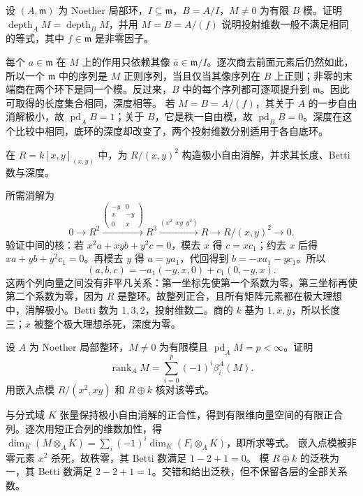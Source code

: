 \begin{exercise}\label{g5:ex:quotient-ring-depth}
	设 \((A,\mathfrak m)\) 为 Noether 局部环，\(I\subseteq\mathfrak m\)，\(B=A/I\)，\(M\ne0\) 为有限 \(B\) 模。证明 \(\operatorname{depth}_A M=\operatorname{depth}_B M\)，并用 \(M=B=A/(f)\) 说明投射维数一般不满足相同的等式，其中 \(f\in\mathfrak m\) 是非零因子。
\end{exercise}
\begin{solution}
	每个 \(a\in\mathfrak m\) 在 \(M\) 上的作用只依赖其像 \(\overline a\in\mathfrak m/I\)。逐次商去前面元素后仍然如此，所以一个 \(\mathfrak m\) 中的序列是 \(M\) 正则序列，当且仅当其像序列在 \(B\) 上正则；非零的末端商在两个环下是同一个模。反过来，\(B\) 中的每个序列都可逐项提升到 \(\mathfrak m\)。因此可取得的长度集合相同，深度相等。
	若 \(M=B=A/(f)\)，其关于 \(A\) 的一步自由消解极小，故 \(\operatorname{pd}_A B=1\)；关于 \(B\)，它是秩一自由模，故 \(\operatorname{pd}_B B=0\)。深度在这个比较中相同，底环的深度却改变了，两个投射维数分别适用于各自底环。
\end{solution}

\begin{exercise}\label{g5:ex:squared-maximal-ideal-resolution}
	在 \(R=k[x,y]_{(x,y)}\) 中，为 \(R/(x,y)^2\) 构造极小自由消解，并求其长度、Betti 数与深度。
\end{exercise}
\begin{solution}
	所需消解为
	\[
		0\longrightarrow R^2
		\xrightarrow{\left(\begin{smallmatrix}-y&0\\x&-y\\0&x\end{smallmatrix}\right)}
		R^3\xrightarrow{(x^2\ \ xy\ \ y^2)}R
		\longrightarrow R/(x,y)^2\longrightarrow0.
	\]
	验证中间的核：若 \(x^2a+xyb+y^2c=0\)，模去 \(x\) 得 \(c=xc_1\)；约去 \(x\) 后得 \(xa+yb+y^2c_1=0\)。再模去 \(y\) 得 \(a=ya_1\)，代回得到 \(b=-xa_1-yc_1\)。所以
	\[
		(a,b,c)=-a_1(-y,x,0)+c_1(0,-y,x).
	\]
	这两个列向量之间没有非平凡关系：第一坐标先使第一个系数为零，第三坐标再使第二个系数为零，因为 \(R\) 是整环。故整列正合，且所有矩阵元素都在极大理想中，消解极小。Betti 数为 \(1,3,2\)，投射维数二。商的 \(k\) 基为 \(1,\overline x,\overline y\)，所以长度三；\(\overline x\) 被整个极大理想杀死，深度为零。
\end{solution}

\begin{exercise}\label{g5:ex:alternating-betti-rank}
	设 \(A\) 为 Noether 局部整环，\(M\ne0\) 为有限模且 \(\operatorname{pd}_A M=p<\infty\)。证明
	\[
		\operatorname{rank}_A M=\sum_{i=0}^p(-1)^i\beta_i^A(M).
	\]
	用嵌入点模 \(R/(x^2,xy)\) 和 \(R\oplus k\) 核对该等式。
\end{exercise}
\begin{solution}
	与分式域 \(K\) 张量保持极小自由消解的正合性，得到有限维向量空间的有限正合列。逐次用短正合列的维数加性，得
	\(\dim_K(M\otimes_AK)=\sum_i(-1)^i\dim_K(F_i\otimes_AK)\)，即所求等式。
	嵌入点模被非零元素 \(x^2\) 杀死，故秩零，其 Betti 数满足 \(1-2+1=0\)。
	模 \(R\oplus k\) 的泛秩为一，其 Betti 数满足 \(2-2+1=1\)。交错和给出泛秩，但不保留各层的全部关系数。
\end{solution}

